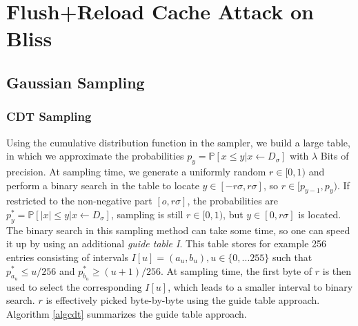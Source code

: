 %
%

\chapter{Flush+Reload Cache Attack on Bliss}
\label{bliss}

\section{Gaussian Sampling} 

\subsection{CDT Sampling}
Using the cumulative distribution function in the sampler, we build a large table, in which we approximate the probabilities $p_y=\mathbb{P}[x \le y| x \leftarrow D_\sigma ]$ with $\lambda$ Bits of precision. At sampling time, we generate a uniformly random $r \in [0,1)$ and perform a binary search in the table to locate $y \in [-r\sigma, r\sigma]$, so $r \in [p_{y-1}, p_y)$. If restricted to the non-negative part $[o, r\sigma]$, the probabilities are $p^*_y = \mathbb{P}[|x| \le y| x \leftarrow D_\sigma]$, sampling is still $r \in [0,1)$, but $y \in [0, r \sigma]$ is located.\\
The binary search in this sampling method can take some time, so one can speed it up by using an additional \textit{guide table I}. This table stores for example 256 entries consisting of intervals $I[u] = (a_u, b_u), u \in \{0,...255\}$ such that $p^*_{a_{u}} \le u/256$ and $p^*_{b_{u}} \ge (u+1)/256$. At sampling time, the first byte of $r$ is then used to select the corresponding $I[u]$, which leads to a smaller interval to binary search. $r$ is effectively picked byte-by-byte using the guide table approach. Algorithm \ref{algcdt} summarizes the guide table approach.
